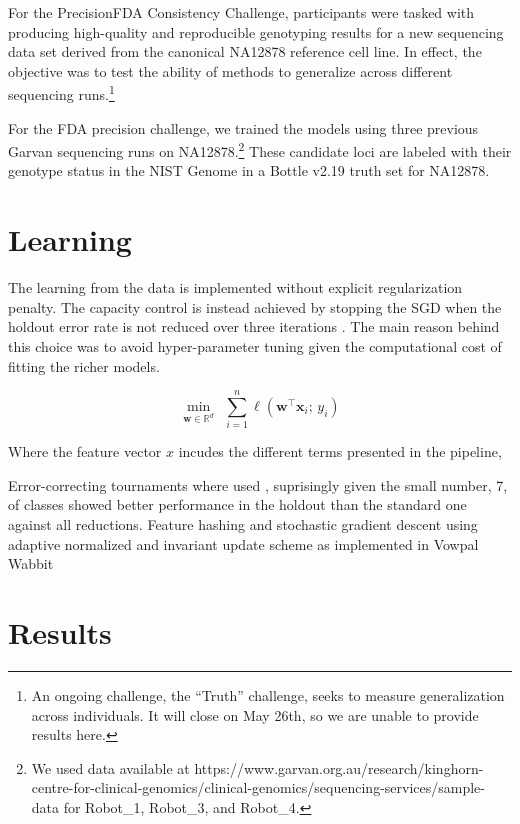 \documentclass{article}
\newcommand{\w}{\mathbf{w}}
\newcommand{\x}{\mathbf{x}}
\newcommand{\R}{\mathbb{R}}
\newcommand{\tr}{{\!\top}}
\begin{document}
For the PrecisionFDA Consistency Challenge, participants were tasked with producing high-quality and reproducible genotyping results for a new sequencing data set derived from the canonical NA12878 reference cell line.
In effect, the objective was to test the ability of methods to generalize across different sequencing runs.\footnote{An ongoing challenge, the ``Truth'' challenge, seeks to measure generalization across individuals. It will close on May 26th, so we are unable to provide results here.}

For the FDA precision challenge, we trained the models using three previous Garvan sequencing runs on NA12878.\footnote{We used data available at https://www.garvan.org.au/research/kinghorn-centre-for-clinical-genomics/clinical-genomics/sequencing-services/sample-data for Robot\_1, Robot\_3, and Robot\_4.}
These candidate loci are labeled with their genotype status in the NIST Genome in a Bottle v2.19 truth set for NA12878.


\section{Learning}

The learning from the data is implemented without explicit regularization penalty. The capacity control is instead achieved by stopping the SGD when the holdout error rate is not reduced over three iterations \citep{hardt2015train}.
The main reason behind this choice was to avoid hyper-parameter tuning given the computational cost of fitting the richer models.


\begin{equation}
  \min_{\w \in \R^d}~~\sum_{i=1}^n\ell(\w^\tr\x_i;\,y_i) 
  \label{eqn:objective}
\end{equation}

Where the feature vector $x$ incudes the different terms presented in the pipeline, 

Error-correcting tournaments \citep{beygelzimer2009error} where used , suprisingly given the small number, 7, of classes showed better performance in the holdout than the standard one against all reductions. 
Feature hashing and stochastic gradient descent using adaptive normalized and invariant update scheme as implemented in Vowpal Wabbit \cite{mcmahan2010adaptive, duchi2011adaptive, agarwal2014reliable} 



\section{Results}
\end{document}
